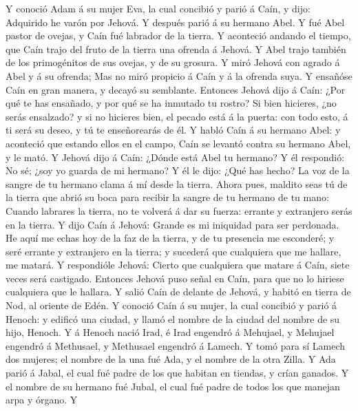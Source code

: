  Y conoció Adam á su mujer Eva, la cual concibió y parió á
Caín, y dijo: Adquirido he varón por Jehová.  Y después
parió á su hermano Abel. Y fué Abel pastor de ovejas, y Caín fué
labrador de la tierra.  Y aconteció andando el tiempo, que
Caín trajo del fruto de la tierra una ofrenda á Jehová.  Y
Abel trajo también de los primogénitos de sus ovejas, y de su grosura. Y
miró Jehová con agrado á Abel y á su ofrenda;  Mas no miró
propicio á Caín y á la ofrenda suya. Y ensañóse Caín en gran manera, y
decayó su semblante.  Entonces Jehová dijo á Caín: ¿Por
qué te has ensañado, y por qué se ha inmutado tu rostro? 
Si bien hicieres, ¿no serás ensalzado? y si no hicieres bien, el pecado
está á la puerta: con todo esto, á ti será su deseo, y tú te
enseñorearás de él.  Y habló Caín á su hermano Abel: y
aconteció que estando ellos en el campo, Caín se levantó contra su
hermano Abel, y le mató.  Y Jehová dijo á Caín: ¿Dónde
está Abel tu hermano? Y él respondió: No sé; ¿soy yo guarda de mi
hermano?  Y él le dijo: ¿Qué has hecho? La voz de la
sangre de tu hermano clama á mí desde la tierra.  Ahora
pues, maldito seas tú de la tierra que abrió su boca para recibir la
sangre de tu hermano de tu mano:  Cuando labrares la
tierra, no te volverá á dar su fuerza: errante y extranjero serás en la
tierra.  Y dijo Caín á Jehová: Grande es mi iniquidad
para ser perdonada.  He aquí me echas hoy de la faz de la
tierra, y de tu presencia me esconderé; y seré errante y extranjero en
la tierra; y sucederá que cualquiera que me hallare, me matará.
 Y respondióle Jehová: Cierto que cualquiera que matare á
Caín, siete veces será castigado. Entonces Jehová puso señal en Caín,
para que no lo hiriese cualquiera que le hallara.  Y
salió Caín de delante de Jehová, y habitó en tierra de Nod, al oriente
de Edén.  Y conoció Caín á su mujer, la cual concibió y
parió á Henoch: y edificó una ciudad, y llamó el nombre de la ciudad del
nombre de su hijo, Henoch.  Y á Henoch nació Irad, é Irad
engendró á Mehujael, y Mehujael engendró á Methusael, y Methusael
engendró á Lamech.  Y tomó para sí Lamech dos mujeres; el
nombre de la una fué Ada, y el nombre de la otra Zilla. 
Y Ada parió á Jabal, el cual fué padre de los que habitan en tiendas, y
crían ganados.  Y el nombre de su hermano fué Jubal, el
cual fué padre de todos los que manejan arpa y órgano.  Y
